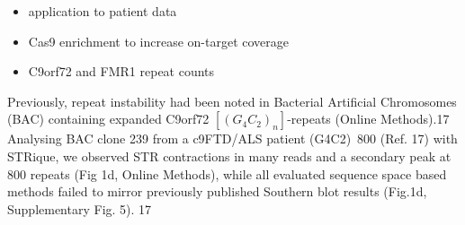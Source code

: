 \begin{itemize}
	\item application to patient data
	\item Cas9 enrichment to increase on-target coverage
	\item C9orf72 and FMR1 repeat counts
\end{itemize}





Previously, repeat instability had been noted in Bacterial Artificial Chromosomes (BAC) containing expanded C9orf72 $ [(G_{4}C_{2})_{n}] $-repeats (Online Methods).17 Analysing BAC clone 239 from a c9FTD/ALS patient (G4C2)~800 (Ref. 17) with STRique, we observed STR contractions in many reads and a secondary peak at 800 repeats (Fig 1d, Online Methods), while all evaluated sequence space based methods failed to mirror previously published Southern blot results (Fig.1d, Supplementary Fig. 5). 17


